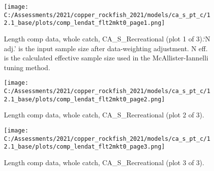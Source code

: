 \documentclass[11pt,
  english,
  a4paper,
]{article}
\begin{document}

\begin{figure}
\centering
\texttt{[image: C:/Assessments/2021/copper\_rockfish\_2021/models/ca\_s\_pt\_c/12.1\_base/plots/comp\_lendat\_flt2mkt0\_page1.png]}
\caption{Length comp data, whole catch, CA\_S\_Recreational (plot 1 of 3).`N adj.' is the input sample size after data-weighting adjustment. N eff. is the calculated effective sample size used in the McAllister-Iannelli tuning method.\label{fig:comp_lendat_flt2mkt0_page1}}
\end{figure}

\tagmcend\tagstructend


\begin{figure}
\centering
\texttt{[image: C:/Assessments/2021/copper\_rockfish\_2021/models/ca\_s\_pt\_c/12.1\_base/plots/comp\_lendat\_flt2mkt0\_page2.png]}
\caption{Length comp data, whole catch, CA\_S\_Recreational (plot 2 of 3).\label{fig:comp_lendat_flt2mkt0_page2}}
\end{figure}

\tagmcend\tagstructend


\begin{figure}
\centering
\texttt{[image: C:/Assessments/2021/copper\_rockfish\_2021/models/ca\_s\_pt\_c/12.1\_base/plots/comp\_lendat\_flt2mkt0\_page3.png]}
\caption{Length comp data, whole catch, CA\_S\_Recreational (plot 3 of 3).\label{fig:comp_lendat_flt2mkt0_page3}}
\end{figure}

\tagmcend\tagstructend

\end{document}
